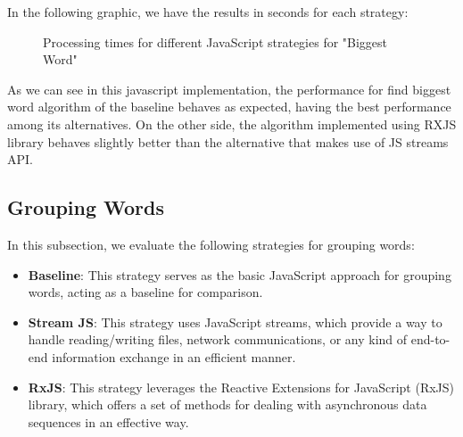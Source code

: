 In the following graphic, we have the results in seconds for each strategy:


\begin{figure}[H]
    \centering
    \caption{Processing times for different JavaScript strategies for "Biggest Word"}
    \label{fig:biggest_word_processing_times_js}
\end{figure}


As we can see in this javascript implementation, the performance for find biggest word algorithm of the baseline behaves as expected, having the best performance among its alternatives. On the other side, the algorithm implemented using RXJS library behaves slightly better than the alternative that makes use of JS streams API.


\clearpage



\subsection{Grouping Words}
\label{subsec:grouping_words_js}

In this subsection, we evaluate the following strategies for grouping words:

\begin{itemize}
    \item \textbf{Baseline}: This strategy serves as the basic JavaScript approach for grouping words, acting as a baseline for comparison.
    \item \textbf{Stream JS}: This strategy uses JavaScript streams, which provide a way to handle reading/writing files, network communications, or any kind of end-to-end information exchange in an efficient manner.
    \item \textbf{RxJS}: This strategy leverages the Reactive Extensions for JavaScript (RxJS) library, which offers a set of methods for dealing with asynchronous data sequences in an effective way.
\end{itemize}

